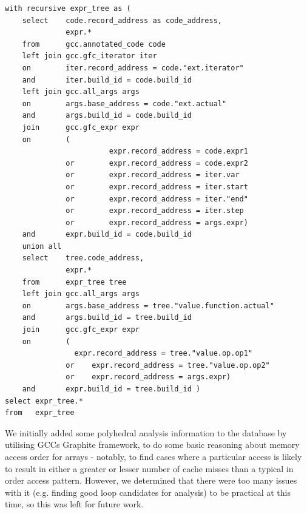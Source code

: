 \begin{lstlisting}[caption=Traversing the Expression Trees, label=lst:expr_tree]
with recursive expr_tree as (
	select    code.record_address as code_address,
	          expr.*
	from      gcc.annotated_code code
	left join gcc.gfc_iterator iter
	on        iter.record_address = code."ext.iterator"
	and       iter.build_id = code.build_id
	left join gcc.all_args args
	on        args.base_address = code."ext.actual"
	and       args.build_id = code.build_id
	join      gcc.gfc_expr expr
	on        (
	                    expr.record_address = code.expr1
	          or        expr.record_address = code.expr2
	          or        expr.record_address = iter.var
	          or        expr.record_address = iter.start
	          or        expr.record_address = iter."end"
	          or        expr.record_address = iter.step
	          or        expr.record_address = args.expr)
	and       expr.build_id = code.build_id
	union all
	select    tree.code_address,
	          expr.*
	from      expr_tree tree
	left join gcc.all_args args
	on        args.base_address = tree."value.function.actual"
	and       args.build_id = tree.build_id
	join      gcc.gfc_expr expr
	on        (
	          	expr.record_address = tree."value.op.op1"
	          or	expr.record_address = tree."value.op.op2"
	          or	expr.record_address = args.expr)
	and       expr.build_id = tree.build_id )
select expr_tree.*
from   expr_tree
\end{lstlisting}

We initially added some polyhedral analysis information to the database by utilising \acsp{GCC} Graphite framework\cite{trifunovic:inria-00551516}, to do some basic reasoning about memory access order for arrays - notably, to find cases where a particular access is likely to result in either a greater or lesser number of cache misses than a typical in order access pattern.
However, we determined that there were too many issues with it (e.g. finding good loop candidates for analysis) to be practical at this time, so this was left for future work.

